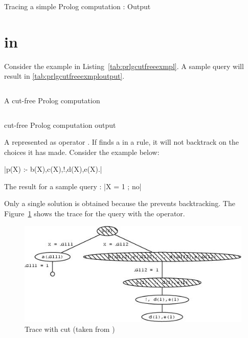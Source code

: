 \documentclass[thesis-solanki.tex]{subfiles}
\begin{document}
\begin{code-list}[H]
  \begin{singlespace}
    \inputminted[linenos, firstline=7]{prolog}{prologprogramtrace.pl}
  \end{singlespace}
  \caption{Tracing a simple Prolog computation \cite{Sterling:1994:APA:175753} : Output}
\label{tab:prlgprgrmtrceop}
\end{code-list}

\section{ in }
Consider the example in Listing~\ref{tab:prlgcutfreeexmpl}.
A sample query  will result in \ref{tab:prlgcutfreeexmploutput}. 

\begin{code-list}[H]
  \begin{singlespace}
    \inputminted[linenos]{prolog}{prlgcutfreeexmpl.pl}
  \end{singlespace}
  \caption{A cut-free Prolog computation \cite{website:cutprologunionedu}}
\label{tab:prlgcutfreeexmpl}
\end{code-list}

\begin{code-list}[H]
  \begin{singlespace}
    \inputminted[linenos]{prolog}{prlgcutfreeexmploutput.pl}
  \end{singlespace}
  \caption{cut-free Prolog computation output\cite{website:cutprologunionedu}}
\label{tab:prlgcutfreeexmploutput}
\end{code-list}

A  represented as \prologConstruct{!}
operator \cite{website:prologcut}.
If  finds a  in a rule, it will not backtrack on the choices it has made.
Consider the example below:

|p(X) :- b(X),c(X),!,d(X),e(X).|

\noindent The result for a sample query :
|X = 1 ; no|

Only a single solution is obtained because the  prevents backtracking. The Figure~\ref{fig:Trace with cut} shows the 
trace for the query with the  operator.

\begin{figure}[H]
\centering
\includegraphics[scale = .95]{prologcutrace.jpeg}
\caption{Trace with cut (taken from \cite{website:cutprologunionedu})}
\label{fig:Trace with cut}
\end{figure}
\end{document}
